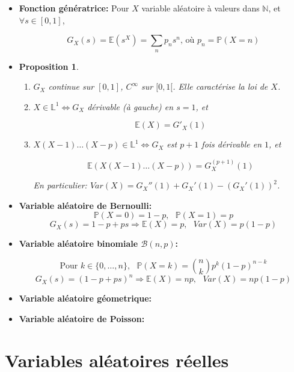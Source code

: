 \documentclass[10pt,a4paper,oneside]{article}
\newtheorem{proposition}{Proposition}
\begin{document}
\begin{itemize}
\item
\textbf{Fonction génératrice:} Pour $X$ variable aléatoire à valeurs dans $\mathbb{N}$, et $\forall s \in [0,1]$,

\[ G_X(s) = \mathbb{E}(s^X) = \sum_{n} p_n s^n\text{, où }p_n = \mathbb{P}(X = n) \]

\item
\begin{proposition}

\begin{enumerate}
\item
$G_X$ continue sur $[0,1]$, $C^\infty$ sur $[0,1[$. Elle caractérise la loi de $X$.

\item
$X \in \mathbb{L}^1 \Leftrightarrow G_X$ dérivable (à gauche) en $s = 1$, et

\[ \mathbb{E}(X) = G'_X(1) \]

\item
$X(X - 1)\ldots(X - p) \in \mathbb{L}^1 \Leftrightarrow G_X$ est $p + 1$ fois dérivable en $1$, et

\[ \mathbb{E}(X(X - 1)\ldots(X - p)) = G_X^{(p + 1)}(1) \]

En particulier: $Var(X) = G_X''(1) + G_X'(1) - (G_X'(1))^2$.
\end{enumerate}

\end{proposition}

\item
\textbf{Variable aléatoire de Bernoulli:}
\[ \mathbb{P}(X = 0) = 1 - p,\text{ }\mathbb{P}(X = 1) = p \]
\[ G_X(s) = 1-p+ps \Rightarrow \mathbb{E}(X) = p,\text{ }Var(X) = p(1-p) \]

\item
\textbf{Variable aléatoire binomiale $\mathcal{B}(n,p)$:}

\[ \text{Pour } k \in \{ 0,\ldots,n \},\text{ }\mathbb{P}(X = k) = \binom{n}{k} p^k(1 - p)^{n - k} \]
\[ G_X(s) = (1 - p + ps)^n \Rightarrow \mathbb{E}(X) = np,\text{ }Var(X) = np(1-p) \]

\item
\textbf{Variable aléatoire géometrique:}

\item
\textbf{Variable aléatoire de Poisson:}

\end{itemize}

\section{Variables aléatoires réelles}
\end{document}
